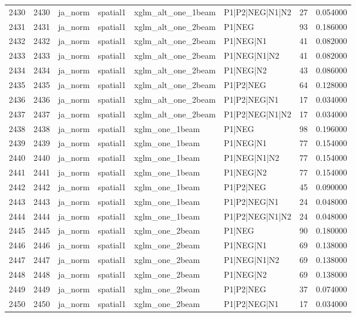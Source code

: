 \begin{tabular}{lrllllrr}
2430 & 2430 & ja_norm & spatial1 & xglm_alt_one_1beam & P1|P2|NEG|N1|N2 & 27 & 0.054000 \\
2431 & 2431 & ja_norm & spatial1 & xglm_alt_one_2beam & P1|NEG & 93 & 0.186000 \\
2432 & 2432 & ja_norm & spatial1 & xglm_alt_one_2beam & P1|NEG|N1 & 41 & 0.082000 \\
2433 & 2433 & ja_norm & spatial1 & xglm_alt_one_2beam & P1|NEG|N1|N2 & 41 & 0.082000 \\
2434 & 2434 & ja_norm & spatial1 & xglm_alt_one_2beam & P1|NEG|N2 & 43 & 0.086000 \\
2435 & 2435 & ja_norm & spatial1 & xglm_alt_one_2beam & P1|P2|NEG & 64 & 0.128000 \\
2436 & 2436 & ja_norm & spatial1 & xglm_alt_one_2beam & P1|P2|NEG|N1 & 17 & 0.034000 \\
2437 & 2437 & ja_norm & spatial1 & xglm_alt_one_2beam & P1|P2|NEG|N1|N2 & 17 & 0.034000 \\
2438 & 2438 & ja_norm & spatial1 & xglm_one_1beam & P1|NEG & 98 & 0.196000 \\
2439 & 2439 & ja_norm & spatial1 & xglm_one_1beam & P1|NEG|N1 & 77 & 0.154000 \\
2440 & 2440 & ja_norm & spatial1 & xglm_one_1beam & P1|NEG|N1|N2 & 77 & 0.154000 \\
2441 & 2441 & ja_norm & spatial1 & xglm_one_1beam & P1|NEG|N2 & 77 & 0.154000 \\
2442 & 2442 & ja_norm & spatial1 & xglm_one_1beam & P1|P2|NEG & 45 & 0.090000 \\
2443 & 2443 & ja_norm & spatial1 & xglm_one_1beam & P1|P2|NEG|N1 & 24 & 0.048000 \\
2444 & 2444 & ja_norm & spatial1 & xglm_one_1beam & P1|P2|NEG|N1|N2 & 24 & 0.048000 \\
2445 & 2445 & ja_norm & spatial1 & xglm_one_2beam & P1|NEG & 90 & 0.180000 \\
2446 & 2446 & ja_norm & spatial1 & xglm_one_2beam & P1|NEG|N1 & 69 & 0.138000 \\
2447 & 2447 & ja_norm & spatial1 & xglm_one_2beam & P1|NEG|N1|N2 & 69 & 0.138000 \\
2448 & 2448 & ja_norm & spatial1 & xglm_one_2beam & P1|NEG|N2 & 69 & 0.138000 \\
2449 & 2449 & ja_norm & spatial1 & xglm_one_2beam & P1|P2|NEG & 37 & 0.074000 \\
2450 & 2450 & ja_norm & spatial1 & xglm_one_2beam & P1|P2|NEG|N1 & 17 & 0.034000 \\

\end{tabular}
